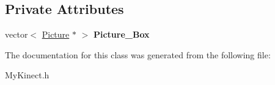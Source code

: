 \subsection*{Private Attributes}
\begin{DoxyCompactItemize}
\item 
\mbox{\label{class_kinect_1_1_my_picture_box_a3526f9db8ee9dad202aadd0c8a09b4e4}} 
vector$<$ \hyperlink{class_kinect_1_1_picture}{Picture} $\ast$ $>$ {\bfseries Picture\+\_\+\+Box}
\end{DoxyCompactItemize}


The documentation for this class was generated from the following file\+:\begin{DoxyCompactItemize}
\item 
My\+Kinect.\+h\end{DoxyCompactItemize}
